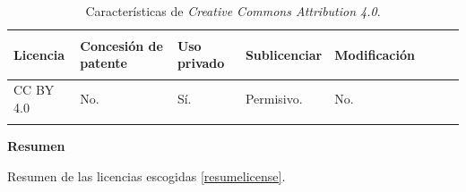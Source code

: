 \begin{longtable}[]{@{}llllllll@{}} 
\toprule \label{ccaresumetable1}
\begin{minipage}[b]{0.15\columnwidth}\raggedright\strut
Licencia\strut
\end{minipage} & \begin{minipage}[b]{0.18\columnwidth}\raggedright\strut
Concesión de patente\strut
\end{minipage} & \begin{minipage}[b]{0.17\columnwidth}\raggedright\strut
Uso privado\strut
\end{minipage} & \begin{minipage}[b]{0.15\columnwidth}\raggedright\strut
Sublicenciar\strut
\end{minipage} & \begin{minipage}[b]{0.17\columnwidth}\raggedright\strut
Modificación\strut
\end{minipage}\tabularnewline
\midrule
\endhead
\begin{minipage}[t]{0.15\columnwidth}\raggedright\strut
CC BY 4.0\strut
\end{minipage} & \begin{minipage}[t]{0.18\columnwidth}\raggedright\strut
No.\strut
\end{minipage} & \begin{minipage}[t]{0.17\columnwidth}\raggedright\strut
Sí.\strut
\end{minipage} & \begin{minipage}[t]{0.15\columnwidth}\raggedright\strut
Permisivo.\strut
\end{minipage} & \begin{minipage}[t]{0.17\columnwidth}\raggedright\strut
No.\strut
\end{minipage}\tabularnewline
\bottomrule
\caption{Características de \textit{Creative Commons Attribution 4.0}.}
\end{longtable}

\textbf{Resumen}

Resumen de las licencias escogidas \ref{resumelicense}.

